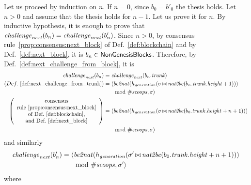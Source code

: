 \noindent
  Let us proceed by induction on $n$.
  If $n=0$, since $b_0=b'_0$ the thesis holds.
  Let $n>0$ and assume that the thesis holds for $n-1$. Let us prove it for $n$.
  By inductive hypothesis, it is enough
  to prove that ${\mathit{challenge}}_{\mathit{next}}(b_n)={\mathit{challenge}}_{\mathit{next}}(b'_n)$.
  Since $n>0$, by consensus rule~\ref{prop:consensus:next_block} of Def.~\ref{def:blockchain}
  and by Def.~\ref{def:next_block}, it is $b_n\in{\mathsf{NonGenesisBlocks}}$. Therefore, by
  Def.~\ref{def:next_challenge_from_block}, it is
  \begin{align*}
    {\mathit{challenge}}_{\mathit{next}}(b_n)&={\mathit{challenge}}_{\mathit{next}}(b_n.{\mathit{trunk}})\\
    (Def.~\ref{def:next_challenge_from_trunk})&=\langle{\mathit{be2nat}}(h_{\mathit{generation}}(\sigma\operatorname*{\bowtie}{\mathit{nat2be}}(b_n.{\mathit{trunk}}.{\mathit{height}}+1)))\\
    &\qquad\text{mod }{\#\mathit{scoops}},\sigma\rangle\\
    \left(\begin{array}{c}
      \text{consensus}\\
      \text{rule~\ref{prop:consensus:next_block}}\\
      \text{of Def.~\ref{def:blockchain},}\\
      \text{and Def.~\ref{def:next_block}}
    \end{array}\right)&=\langle{\mathit{be2nat}}(h_{\mathit{generation}}(\sigma\operatorname*{\bowtie}{\mathit{nat2be}}(b_0.{\mathit{trunk}}.{\mathit{height}}+n+1)))\\
    &\qquad\text{mod }{\#\mathit{scoops}},\sigma\rangle
  \end{align*}
  and similarly
  \begin{align*}
    {\mathit{challenge}}_{\mathit{next}}(b'_n)&=\langle{\mathit{be2nat}}(h_{\mathit{generation}}(\sigma'\operatorname*{\bowtie}{\mathit{nat2be}}(b_0.{\mathit{trunk}}.{\mathit{height}}+n+1)))\\
    &\qquad\text{mod }{\#\mathit{scoops}},\sigma'\rangle
  \end{align*}
  where
